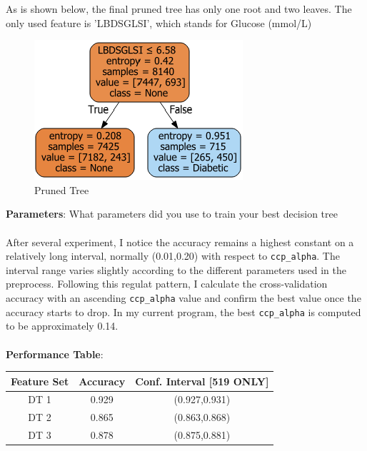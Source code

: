 \documentclass{article}
\begin{document}
		
		As is shown below, the final pruned tree has only one root and two leaves. The only used feature is 'LBDSGLSI', which stands for Glucose (mmol/L)        
        
        \begin{figure}[h!]
       	\centering
		\includegraphics[scale=2]{PrunedTree.png}
  		\caption{Pruned Tree}
  		\label{fig:PrunedTree}
		\end{figure}        
        
        \newpage                     
        \noindent\textbf{Parameters}: What parameters did you use to train your best decision tree\\\\
        After several experiment, I notice the accuracy remains a highest constant on a relatively long interval, normally (0.01,0.20) with respect to \texttt{ccp\_alpha}. The interval range varies slightly according to the different parameters used in the preprocess. Following this regulat pattern, I calculate the cross-validation accuracy with an ascending \texttt{ccp\_alpha} value and confirm the best value once the accuracy starts to drop. In my current program, the best \texttt{ccp\_alpha} is computed to be approximately 0.14.\\\\

        \noindent\textbf{Performance Table}: 
        \begin{center}
            \begin{tabular}{|c|c|c|}
                \hline
                Feature Set & Accuracy & Conf. Interval [519 ONLY]\\
                \hline
                DT 1 & 0.929 & (0.927,0.931)  \\
                DT 2 & 0.865 & (0.863,0.868)  \\
                DT 3 & 0.878 & (0.875,0.881)  \\
                \hline
        \end{tabular}
                \end{center}
        
\end{document}
